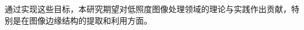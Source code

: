 \documentclass[a4paper]{ctexart}
\begin{document}
	通过实现这些目标，本研究期望对低照度图像处理领域的理论与实践作出贡献，特别是在图像边缘结构的提取和利用方面。
	
\end{document}
